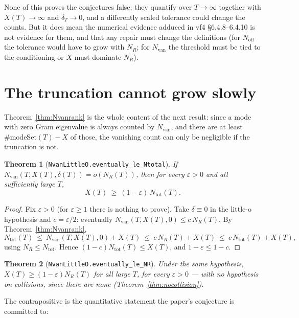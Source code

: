 \documentclass[11pt,a4paper]{article}
\newcommand{\lb}{\_\allowbreak}
\newcommand{\code}[1]{\texttt{#1}}
\newtheorem{theorem}{Theorem}[section]
\theoremstyle{definition}
\theoremstyle{remark}
\begin{document}
\medskip
\noindent
None of this proves the conjectures false: they quantify over $T\to\infty$ together with
$X(T)\to\infty$ and $\delta_T\to0$, and a differently scaled tolerance could change the
counts.  But it does mean the numerical evidence adduced in vf4 \S6.4.8--6.4.10 is not
evidence for them, and that any repair must change the definitions (for $N_{\mathrm{off}}$
the tolerance would have to grow with $N_R$; for $N_{\mathrm{van}}$ the threshold must be
tied to the conditioning or $X$ must dominate $N_R$).


\section{The truncation cannot grow slowly}\label{sec:necessary}

Theorem~\ref{thm:Nvanrank} is the whole content of the next result: since a mode with zero
Gram eigenvalue is always counted by $N_{\mathrm{van}}$, and there are at least
$\#\mathrm{modeSet}(T)-X$ of those, the vanishing count can only be negligible if the
truncation is not.

\begin{theorem}[\code{NvanLittleO.eventually\lb le\lb Ntotal}]\label{thm:necessary}
If $N_{\mathrm{van}}(T,X(T),\delta(T))=o(N_R(T))$, then for every $\varepsilon>0$ and all
sufficiently large $T$,
\[
  X(T)\ \ge\ (1-\varepsilon)\,N_{\mathrm{tot}}(T).
\]
\end{theorem}
\begin{proof}
Fix $\varepsilon>0$ (for $\varepsilon\ge1$ there is nothing to prove).  Take $\delta\equiv0$
in the little-o hypothesis and $c=\varepsilon/2$: eventually
$N_{\mathrm{van}}(T,X(T),0)\le c\,N_R(T)$.  By Theorem~\ref{thm:Nvanrank},
\[
  N_{\mathrm{tot}}(T)\ \le\ N_{\mathrm{van}}(T,X(T),0)+X(T)\ \le\ c\,N_R(T)+X(T)
  \ \le\ c\,N_{\mathrm{tot}}(T)+X(T),
\]
using $N_R\le N_{\mathrm{tot}}$.  Hence $(1-c)N_{\mathrm{tot}}(T)\le X(T)$, and
$1-\varepsilon\le1-c$.
\end{proof}

\begin{theorem}[\code{NvanLittleO.eventually\lb le\lb NR}]
Under the same hypothesis, $X(T)\ge(1-\varepsilon)N_R(T)$ for all large $T$, for every
$\varepsilon>0$ --- with no hypothesis on collisions, since there are none
(Theorem~\ref{thm:nocollision}).
\end{theorem}

The contrapositive is the quantitative statement the paper's conjecture is committed to:
\end{document}
